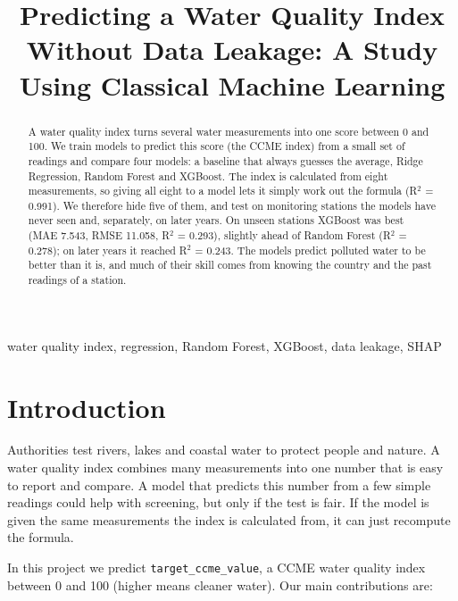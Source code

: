 \documentclass[conference]{IEEEtran}
\begin{document}
\title{Predicting a Water Quality Index Without Data Leakage: A Study Using Classical Machine Learning}
\author{
}
\maketitle
\begin{abstract}
A water quality index turns several water measurements into one score between 0 and 100. We train models to predict this score (the CCME index) from a small set of readings and compare four models: a baseline that always guesses the average, Ridge Regression, Random Forest and XGBoost. The index is calculated from eight measurements, so giving all eight to a model lets it simply work out the formula (R$^2$ = 0.991). We therefore hide five of them, and test on monitoring stations the models have never seen and, separately, on later years. On unseen stations XGBoost was best (MAE 7.543, RMSE 11.058, R$^2$ = 0.293), slightly ahead of Random Forest (R$^2$ = 0.278); on later years it reached R$^2$ = 0.243. The models predict polluted water to be better than it is, and much of their skill comes from knowing the country and the past readings of a station.
\end{abstract}
\begin{IEEEkeywords}
water quality index, regression, Random Forest, XGBoost, data leakage, SHAP
\end{IEEEkeywords}
\section{Introduction}
Authorities test rivers, lakes and coastal water to protect people and nature. A water quality index combines many measurements into one number that is easy to report and compare. A model that predicts this number from a few simple readings could help with screening, but only if the test is fair. If the model is given the same measurements the index is calculated from, it can just recompute the formula.

In this project we predict \texttt{target\_ccme\_value}, a CCME water quality index between 0 and 100 (higher means cleaner water). Our main contributions are:
\end{document}
